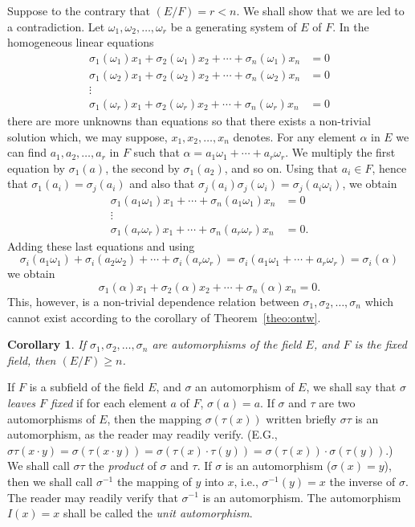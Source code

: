 \documentclass[11pt]{article}
\newtheorem*{coro*}{Corollary}
\theoremstyle{definition}
\begin{document}
Suppose to the contrary that $(E/F) = r < n$.
We shall show that we are led to a contradiction.
Let $\omega_1, \omega_2, \ldots, \omega_r$ be a generating system of $E$ of $F$.
In the homogeneous linear equations
\begin{align*}
\sigma_1(\omega_1)x_1 + \sigma_2(\omega_1)x_2 + \cdots + \sigma_n(\omega_1)x_n &= 0
\\
\sigma_1(\omega_2)x_1 + \sigma_2(\omega_2)x_2 + \cdots + \sigma_n(\omega_2)x_n &= 0
\\
\vdots &
\\
\sigma_1(\omega_r)x_1 + \sigma_2(\omega_r)x_2 + \cdots + \sigma_n(\omega_r)x_n &= 0
\end{align*}
there are more unknowns than equations so that there exists a non-trivial solution which, we may suppose, $x_1, x_2, \ldots, x_n$ denotes.
For any element $\alpha$ in $E$ we can find $a_1, a_2, \ldots, a_r$ in $F$ such that $\alpha = a_1 \omega_1 + \cdots + a_r \omega_r$.
We multiply the first equation by $\sigma_1(a)$, the second by $\sigma_1(a_2)$, and so on.
Using that $a_i \in F$, hence that $\sigma_1(a_i) = \sigma_j(a_i)$ and also that $\sigma_j(a_i) \sigma_j(\omega_i) = \sigma_j(a_i \omega_i)$, we obtain
\begin{align*}
\sigma_1(a_1 \omega_1)x_1 + \cdots + \sigma_n(a_1 \omega_1)x_n &= 0
\\
\vdots &
\\
\sigma_1(a_r \omega_r)x_1 + \cdots + \sigma_n(a_r \omega_r)x_n &= 0.
\end{align*}
Adding these last equations and using
\[
\sigma_i(a_1 \omega_1) + \sigma_i(a_2 \omega_2) + \cdots + \sigma_i(a_r \omega_r)
= \sigma_i(a_1 \omega_1 + \cdots + a_r \omega_r) 
= \sigma_i(\alpha)
\]
we obtain
\[
\sigma_1(\alpha)x_1 + \sigma_2(\alpha)x_2 + \cdots + \sigma_n(\alpha)x_n = 0.
\]
This, however, is a non-trivial dependence relation between $\sigma_1, \sigma_2, \ldots, \sigma_n$ which cannot exist according to the corollary of Theorem~\ref{theo:ontw}. 


\begin{coro*}
If $\sigma_1, \sigma_2, \ldots, \sigma_n$ are automorphisms of the field $E$, and $F$ is the fixed field, then $(E/F) \geq n$.
\end{coro*}


If $F$ is a subfield of the field $E$, and $\sigma$ an automorphism of $E$, we shall say that $\sigma$ \emph{leaves $F$ fixed} if for each element $a$ of $F$, $\sigma(a) = a$.
If $\sigma$ and $\tau$ are two automorphisms of $E$, then the mapping $\sigma(\tau(x))$ written briefly $\sigma\tau$ is an automorphism, as the reader may readily verify.
(E.G., $\sigma\tau(x\cdot y) = \sigma(\tau(x \cdot y)) = \sigma(\tau(x) \cdot \tau(y)) = \sigma(\tau(x)) \cdot \sigma(\tau(y))$.)
We shall call $\sigma\tau$ the \emph{product} of $\sigma$ and $\tau$.
If $\sigma$ is an automorphism ($\sigma(x) = y$), then we shall call $\sigma^{-1}$ the mapping of $y$ into $x$, i.e., $\sigma^{-1}(y) = x$ the inverse of $\sigma$.\label{p38}
The reader may readily verify that $\sigma^{-1}$ is an automorphism.
The automorphism $I(x) = x$ shall be called the \emph{unit automorphism}.
\end{document}
